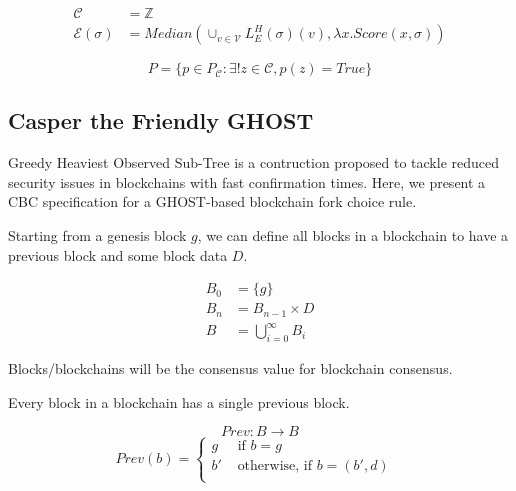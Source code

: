 \begin{defn}
\begin{align*}
\mathcal{C} &= \mathbb{Z} \\
\mathcal{E}(\sigma) &= Median(\cup_{v \in \mathcal{V}} L^H_E(\sigma)(v), \lambda x. Score(x, \sigma))
\end{align*}

\end{defn}

\begin{defn}
$$
P = \{p \in P_{\mathcal{C}} : \exists! z \in \mathcal{C}, p(z) = True\}
$$
\end{defn}



\subsection{Casper the Friendly GHOST}

Greedy Heaviest Observed Sub-Tree\cite{GHOST} is a contruction proposed to tackle reduced security issues in blockchains with fast confirmation times. Here, we present a CBC specification for a GHOST-based blockchain fork choice rule.

Starting from a genesis block $g$, we can define all blocks in a blockchain to have a previous block and some block data $D$.

\begin{defn}[Blocks]
\begin{align*}
B_0 &= \{g\} \\
B_n &= B_{n-1} \times D \\
B &= \bigcup_{i = 0}^{\infty} B_i
\end{align*}
\end{defn}

Blocks/blockchains will be the consensus value for blockchain consensus.

Every block in a blockchain has a single previous block.

\begin{defn}
$$
Prev: B \to B
$$
\[ Prev(b) = \begin{cases}
  g  &\text{ if $b = g$ }\\
  b' &\text{ otherwise, if $b = (b', d)$ }\\
   \end{cases}
\]
\end{defn}


